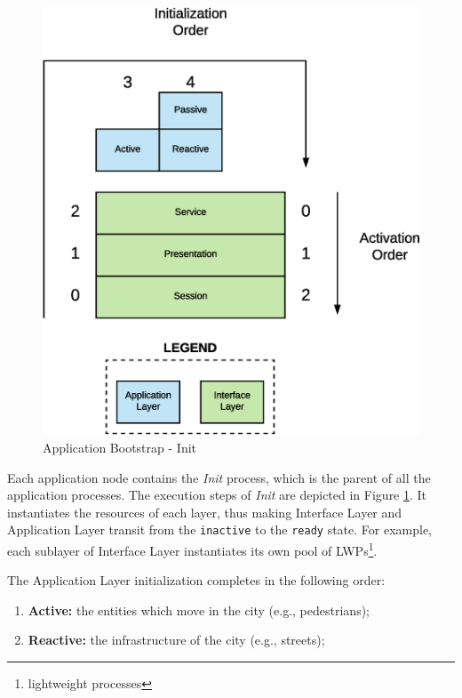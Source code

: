 \begin{figure}[H]
  \centering
  \includegraphics[scale=0.5,keepaspectratio]
    {images/solution/init_activate.eps}
  \caption{Application Bootstrap - Init}
  \label{fig:sd-app-init}
\end{figure}



Each application node contains the \textit{Init} process,
which is the parent of all the application processes.
The execution steps of \textit{Init} are depicted in Figure
\ref{fig:sd-app-init}.
It instantiates the resources of each layer, thus making
Interface Layer and Application Layer transit from the \verb|inactive|
to the \verb|ready| state.
For example, each sublayer of Interface Layer instantiates its own pool of
LWPs\footnote{lightweight processes}.

The Application Layer initialization completes in the following order:

\begin{enumerate}
  \item \textbf{Active:} the entities which move in the city (e.g.,
    pedestrians);
  \item \textbf{Reactive:} the infrastructure of the city (e.g., streets);
\end{enumerate}

